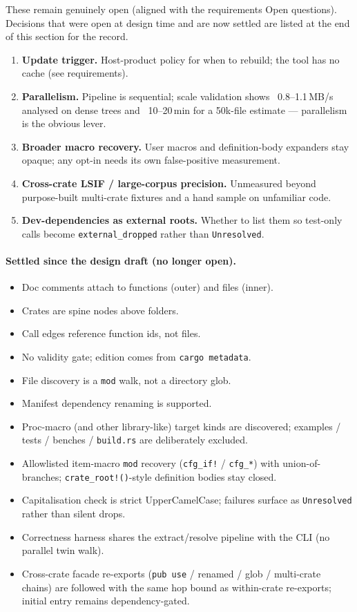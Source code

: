 \documentclass[11pt,a4paper]{article}
\begin{document}
These remain genuinely open (aligned with the requirements Open questions).
Decisions that were open at design time and are now settled are listed at the
end of this section for the record.

\begin{enumerate}[leftmargin=1.5em]
  \item \textbf{Update trigger.} Host-product policy for when to rebuild;
    the tool has no cache (see requirements).
  \item \textbf{Parallelism.} Pipeline is sequential; scale validation shows
    ~0.8--1.1\,MB/s analysed on dense trees and ~10--20\,min for a 50k-file
    estimate --- parallelism is the obvious lever.
  \item \textbf{Broader macro recovery.} User macros and definition-body
    expanders stay opaque; any opt-in needs its own false-positive measurement.
  \item \textbf{Cross-crate LSIF / large-corpus precision.} Unmeasured beyond
    purpose-built multi-crate fixtures and a hand sample on unfamiliar code.
  \item \textbf{Dev-dependencies as external roots.} Whether to list them so
    test-only calls become \verb|external_dropped| rather than
    \verb|Unresolved|.
\end{enumerate}

\paragraph{Settled since the design draft (no longer open).}
\begin{itemize}[nosep]
  \item Doc comments attach to functions (outer) and files (inner).
  \item Crates are spine nodes above folders.
  \item Call edges reference function ids, not files.
  \item No validity gate; edition comes from \verb|cargo metadata|.
  \item File discovery is a \verb|mod| walk, not a directory glob.
  \item Manifest dependency renaming is supported.
  \item Proc-macro (and other library-like) target kinds are discovered;
    examples / tests / benches / \verb|build.rs| are deliberately excluded.
  \item Allowlisted item-macro \verb|mod| recovery (\verb|cfg_if!| / \verb|cfg_*|)
    with union-of-branches; \verb|crate_root!()|-style definition bodies stay closed.
  \item Capitalisation check is strict UpperCamelCase; failures surface as
    \verb|Unresolved| rather than silent drops.
  \item Correctness harness shares the extract/resolve pipeline with the CLI
    (no parallel twin walk).
  \item Cross-crate facade re-exports (\verb|pub use| / renamed / glob /
    multi-crate chains) are followed with the same hop bound as within-crate
    re-exports; initial entry remains dependency-gated.
\end{itemize}
\end{document}
